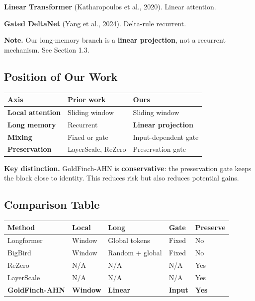 \textbf{Linear Transformer} (Katharopoulos et al., 2020). Linear attention.

\textbf{Gated DeltaNet} (Yang et al., 2024). Delta-rule recurrent.

\textbf{Note.} Our long-memory branch is a \textbf{linear projection}, not a recurrent 
mechanism. See Section 1.3.

\subsection{Position of Our Work}

\begin{table}[H]
\centering
\small
\begin{tabular}{lll}
\toprule
\textbf{Axis} & \textbf{Prior work} & \textbf{Ours} \\
\midrule
\textbf{Local attention} & Sliding window & Sliding window \\
\textbf{Long memory} & Recurrent & \textbf{Linear projection} \\
\textbf{Mixing} & Fixed or gate & Input-dependent gate \\
\textbf{Preservation} & LayerScale, ReZero & Preservation gate \\
\bottomrule
\end{tabular}
\end{table}

\textbf{Key distinction.} GoldFinch-AHN is \textbf{conservative}: the preservation 
gate keeps the block close to identity. This reduces risk but also reduces 
potential gains.



\subsection{Comparison Table}

\begin{table}[H]
\centering
\small
\begin{tabular}{lllll}
\toprule
\textbf{Method} & \textbf{Local} & \textbf{Long} & \textbf{Gate} & \textbf{Preserve} \\
\midrule
Longformer & Window & Global tokens & Fixed & No \\
BigBird & Window & Random + global & Fixed & No \\
ReZero & N/A & N/A & N/A & Yes \\
LayerScale & N/A & N/A & N/A & Yes \\
\textbf{GoldFinch-AHN} & \textbf{Window} & \textbf{Linear} & \textbf{Input} & \textbf{Yes} \\
\bottomrule
\end{tabular}
\end{table}


